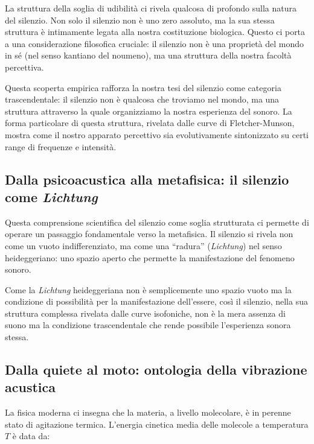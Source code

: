\documentclass{gs-adonis}
\begin{document}
La struttura della soglia di udibilità ci rivela qualcosa di profondo
sulla natura del silenzio. Non solo il silenzio non è uno zero assoluto,
ma la sua stessa struttura è intimamente legata alla nostra costituzione
biologica. Questo ci porta a una considerazione filosofica cruciale: il
silenzio non è una proprietà del mondo in sé (nel senso kantiano del
noumeno), ma una struttura della nostra facoltà percettiva.

Questa scoperta empirica rafforza la nostra tesi del silenzio come
categoria trascendentale: il silenzio non è qualcosa che troviamo nel
mondo, ma una struttura attraverso la quale organizziamo la nostra
esperienza del sonoro. La forma particolare di questa struttura,
rivelata dalle curve di Fletcher-Munson, mostra come il nostro apparato
percettivo sia evolutivamente sintonizzato su certi range di frequenze e
intensità.

\subsection{\texorpdfstring{Dalla psicoacustica alla metafisica: il
silenzio come
\emph{Lichtung}}{Dalla psicoacustica alla metafisica: il silenzio come Lichtung}}\label{dalla-psicoacustica-alla-metafisica-il-silenzio-come-lichtung}

Questa comprensione scientifica del silenzio come soglia strutturata ci
permette di operare un passaggio fondamentale verso la metafisica. Il
silenzio si rivela non come un vuoto indifferenziato, ma come una
``radura'' (\emph{Lichtung}) nel senso heideggeriano: uno spazio aperto
che permette la manifestazione del fenomeno sonoro.

Come la \emph{Lichtung} heideggeriana non è semplicemente uno spazio
vuoto ma la condizione di possibilità per la manifestazione dell'essere,
così il silenzio, nella sua struttura complessa rivelata dalle curve
isofoniche, non è la mera assenza di suono ma la condizione
trascendentale che rende possibile l'esperienza sonora stessa.

\subsection{Dalla quiete al moto: ontologia della vibrazione
acustica}\label{dalla-quiete-al-moto-ontologia-della-vibrazione-acustica}

La fisica moderna ci insegna che la materia, a livello molecolare, è in
perenne stato di agitazione termica. L'energia cinetica media delle
molecole a temperatura \(T\) è data da:
\end{document}
